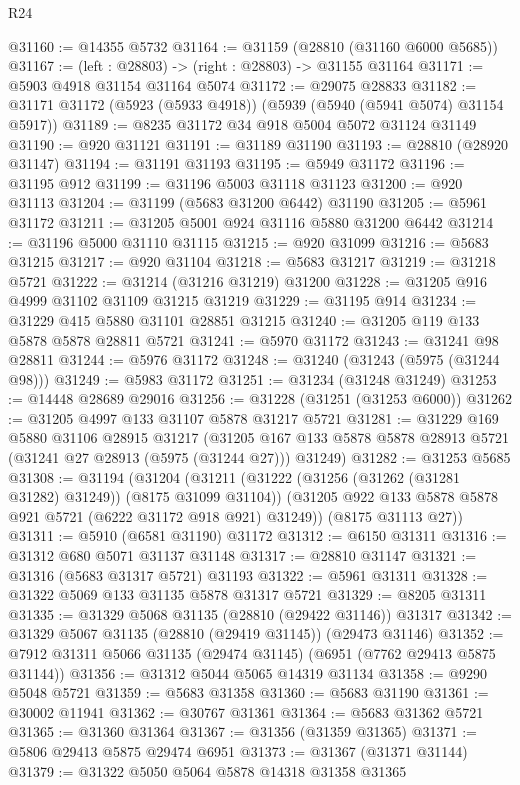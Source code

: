 \begin{lexlean}{R24}
\begin{coremodule}
@31160 := @14355 @5732
@31164 := @31159 (@28810 (@31160 @6000 @5685))
@31167 := (left : @28803) -> (right : @28803) -> @31155 @31164
@31171 := @5903 @4918 @31154 @31164 @5074
@31172 := @29075 @28833
@31182 := @31171 @31172 (@5923 (@5933 @4918)) (@5939 (@5940 (@5941 @5074) @31154 @5917))
@31189 := @8235 @31172 @34 @918 @5004 @5072 @31124 @31149
@31190 := @920 @31121
@31191 := @31189 @31190
@31193 := @28810 (@28920 @31147)
@31194 := @31191 @31193
@31195 := @5949 @31172
@31196 := @31195 @912
@31199 := @31196 @5003 @31118 @31123
@31200 := @920 @31113
@31204 := @31199 (@5683 @31200 @6442) @31190
@31205 := @5961 @31172
@31211 := @31205 @5001 @924 @31116 @5880 @31200 @6442
@31214 := @31196 @5000 @31110 @31115
@31215 := @920 @31099
@31216 := @5683 @31215
@31217 := @920 @31104
@31218 := @5683 @31217
@31219 := @31218 @5721
@31222 := @31214 (@31216 @31219) @31200
@31228 := @31205 @916 @4999 @31102 @31109 @31215 @31219
@31229 := @31195 @914
@31234 := @31229 @415 @5880 @31101 @28851 @31215
@31240 := @31205 @119 @133 @5878 @5878 @28811 @5721
@31241 := @5970 @31172
@31243 := @31241 @98 @28811
@31244 := @5976 @31172
@31248 := @31240 (@31243 (@5975 (@31244 @98)))
@31249 := @5983 @31172
@31251 := @31234 (@31248 @31249)
@31253 := @14448 @28689 @29016
@31256 := @31228 (@31251 (@31253 @6000))
@31262 := @31205 @4997 @133 @31107 @5878 @31217 @5721
@31281 := @31229
    @169
    @5880
    @31106
    @28915
    @31217
    (@31205 @167 @133 @5878 @5878 @28913 @5721 (@31241 @27 @28913 (@5975 (@31244 @27))) @31249)
@31282 := @31253 @5685
@31308 := @31194
    (@31204
      (@31211
        (@31222 (@31256 (@31262 (@31281 @31282) @31249)) (@8175 @31099 @31104))
        (@31205 @922 @133 @5878 @5878 @921 @5721 (@6222 @31172 @918 @921) @31249))
      (@8175 @31113 @27))
@31311 := @5910 (@6581 @31190) @31172
@31312 := @6150 @31311
@31316 := @31312 @680 @5071 @31137 @31148
@31317 := @28810 @31147
@31321 := @31316 (@5683 @31317 @5721) @31193
@31322 := @5961 @31311
@31328 := @31322 @5069 @133 @31135 @5878 @31317 @5721
@31329 := @8205 @31311
@31335 := @31329 @5068 @31135 (@28810 (@29422 @31146)) @31317
@31342 := @31329 @5067 @31135 (@28810 (@29419 @31145)) (@29473 @31146)
@31352 := @7912 @31311 @5066 @31135 (@29474 @31145) (@6951 (@7762 @29413 @5875 @31144))
@31356 := @31312 @5044 @5065 @14319 @31134
@31358 := @9290 @5048 @5721
@31359 := @5683 @31358
@31360 := @5683 @31190
@31361 := @30002 @11941
@31362 := @30767 @31361
@31364 := @5683 @31362 @5721
@31365 := @31360 @31364
@31367 := @31356 (@31359 @31365)
@31371 := @5806 @29413 @5875 @29474 @6951
@31373 := @31367 (@31371 @31144)
@31379 := @31322 @5050 @5064 @5878 @14318 @31358 @31365

\end{coremodule}
\end{lexlean}
